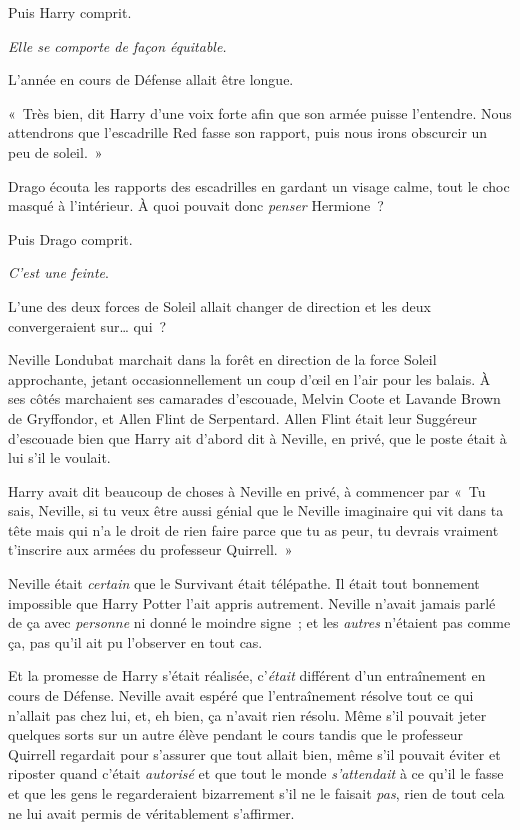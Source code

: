 Puis Harry comprit.

\emph{Elle se comporte de façon équitable.}

L'année en cours de Défense allait être longue.

«~Très bien, dit Harry d'une voix forte afin que son armée puisse l'entendre. Nous attendrons que l'escadrille Red fasse son rapport, puis nous irons obscurcir un peu de soleil.~»

\later

Drago écouta les rapports des escadrilles en gardant un visage calme, tout le choc masqué à l'intérieur. À quoi pouvait donc \emph{penser} Hermione~?

Puis Drago comprit.

\emph{C'est une feinte}.

L'une des deux forces de Soleil allait changer de direction et les deux convergeraient sur… qui~?

\later

Neville Londubat marchait dans la forêt en direction de la force Soleil approchante, jetant occasionnellement un coup d'œil en l'air pour les balais. À ses côtés marchaient ses camarades d'escouade, Melvin Coote et Lavande Brown de Gryffondor, et Allen Flint de Serpentard. Allen Flint était leur Suggéreur d'escouade bien que Harry ait d'abord dit à Neville, en privé, que le poste était à lui s'il le voulait.

Harry avait dit beaucoup de choses à Neville en privé, à commencer par «~Tu sais, Neville, si tu veux être aussi génial que le Neville imaginaire qui vit dans ta tête mais qui n'a le droit de rien faire parce que tu as peur, tu devrais vraiment t'inscrire aux armées du professeur Quirrell.~»

Neville était \emph{certain} que le Survivant était télépathe. Il était tout bonnement impossible que Harry Potter l'ait appris autrement. Neville n'avait jamais parlé de ça avec \emph{personne} ni donné le moindre signe~; et les \emph{autres} n'étaient pas comme ça, pas qu'il ait pu l'observer en tout cas.

Et la promesse de Harry s'était réalisée, c'\emph{était} différent d'un entraînement en cours de Défense. Neville avait espéré que l'entraînement résolve tout ce qui n'allait pas chez lui, et, eh bien, ça n'avait rien résolu. Même s'il pouvait jeter quelques sorts sur un autre élève pendant le cours tandis que le professeur Quirrell regardait pour s'assurer que tout allait bien, même s'il pouvait éviter et riposter quand c'était \emph{autorisé} et que tout le monde \emph{s'attendait} à ce qu'il le fasse et que les gens le regarderaient bizarrement s'il ne le faisait \emph{pas}, rien de tout cela ne lui avait permis de véritablement s'affirmer.

